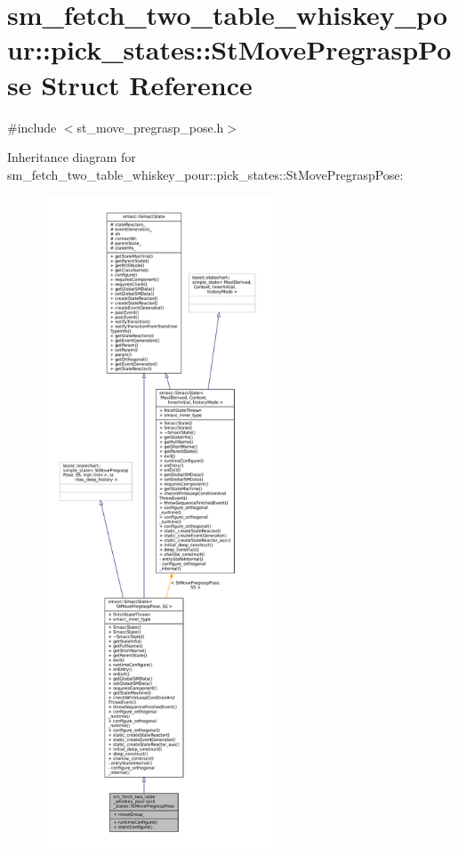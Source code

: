 \hypertarget{structsm__fetch__two__table__whiskey__pour_1_1pick__states_1_1StMovePregraspPose}{}\section{sm\+\_\+fetch\+\_\+two\+\_\+table\+\_\+whiskey\+\_\+pour\+:\+:pick\+\_\+states\+:\+:St\+Move\+Pregrasp\+Pose Struct Reference}
\label{structsm__fetch__two__table__whiskey__pour_1_1pick__states_1_1StMovePregraspPose}


{\ttfamily \#include $<$st\+\_\+move\+\_\+pregrasp\+\_\+pose.\+h$>$}



Inheritance diagram for sm\+\_\+fetch\+\_\+two\+\_\+table\+\_\+whiskey\+\_\+pour\+:\+:pick\+\_\+states\+:\+:St\+Move\+Pregrasp\+Pose\+:
\nopagebreak
\begin{figure}[H]
\begin{center}
\leavevmode
\includegraphics[height=550pt]{structsm__fetch__two__table__whiskey__pour_1_1pick__states_1_1StMovePregraspPose__inherit__graph}
\end{center}
\end{figure}



